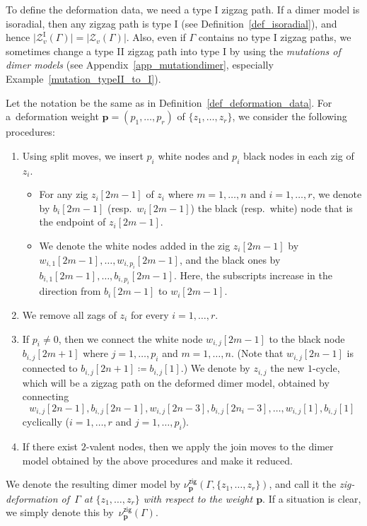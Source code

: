 \documentclass[11pt]{article}
\numberwithin{equation}{section}
\numberwithin{equation}{section}
\numberwithin{figure}{section}
\numberwithin{table}{section}
\newcommand{\rmI}{\mathrm{I}}
\newcommand{\calZ}{\mathcal{Z}}
\newcommand{\bfp}{\mathbf{p}}
\newcommand{\zig}{\mathsf{zig}}
\begin{document}
\begin{Remark}\label{rem_typeI_to_typeII}
To define the deformation data, we need a type I zigzag path.
If a dimer model is isoradial, then any zigzag path is type I (see Definition~\ref{def_isoradial}), and hence $\big|\calZ_v^\rmI(\Gamma)\big|=|\calZ_v(\Gamma)|$.
Also, even if $\Gamma$ contains no type I zigzag paths, we sometimes change a type II zigzag path into type I by using the \emph{mutations of dimer models}
(see Appendix~\ref{app_mutationdimer}, especially Example~\ref{mutation_typeII_to_I}).
\end{Remark}

\begin{Definition}\label{def_deformation_zig}
Let the notation be the same as in Definition~\ref{def_deformation_data}.
For a~deformation weight $\bfp=(p_1,\dots,p_r)$ of $\{z_1, \dots, z_r\}$, we consider the following procedures:
\begin{enumerate}
\setlength{\parskip}{0pt}\itemsep=0pt
\item Using split moves, we insert $p_i$ white nodes and $p_i$ black nodes in each zig of $z_i$.

\noindent{\bf [Notation]}
\begin{itemize}\itemsep=0pt
\item For any zig $z_i[2m-1]$ of $z_i$ where $m=1,\dots,n$ and $i=1,\dots,r$, we denote by $b_i[2m-1]$ (resp.~$w_i[2m-1]$) the black (resp.\ white) node that is the endpoint of $z_i[2m-1]$.
\item We denote the white nodes added in the zig $z_i[2m-1]$ by $w_{i,1}[2m-1],\dots,w_{i,p_i}[2m-1]$, and the black ones by $b_{i,1}[2m-1],\dots,b_{i,p_i}[2m-1]$.
Here, the subscripts increase in the direction from $b_i[2m-1]$ to $w_i[2m-1]$.
\end{itemize}
\item We remove all zags of $z_i$ for every $i=1,\dots,r$.
\item If $p_i\neq 0$, then we connect the white node $w_{i,j}[2m-1]$ to the black node $b_{i,j}[2m+1]$ where $j=1,\dots,p_i$ and $m=1,\dots,n$.
(Note that $w_{i,j}[2n-1]$ is connected to $b_{i,j}[2n+1]\coloneqq b_{i,j}[1]$.)
We denote by $z_{i,j}$ the new $1$-cycle, which will be a zigzag path on the deformed dimer model, obtained by connecting
\begin{displaymath}
w_{i,j}[2n-1], b_{i,j}[2n-1], w_{i,j}[2n-3], b_{i,j}[2n_i-3],\dots,w_{i,j}[1], b_{i,j}[1]
\end{displaymath}
cyclically ($i=1,\dots,r$ and $j=1,\dots,p_i$).
\item[(join)] If there exist $2$-valent nodes, then we apply the join moves to the dimer model obtained by the above procedures and make it reduced.
\end{enumerate}
We denote the resulting dimer model by $\nu^\zig_\bfp(\Gamma, \{z_1,\dots,z_r\})$,
and call it the \emph{zig-deformation of~$\Gamma$ at $\{z_1,\dots,z_r\}$ with respect to the weight $\bfp$}.
If a situation is clear, we simply denote this by~$\nu^\zig_\bfp(\Gamma)$.
\end{Definition}
\end{document}
